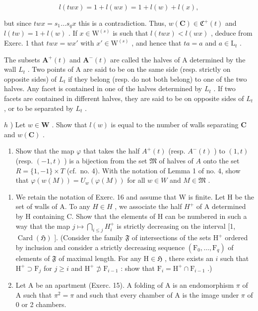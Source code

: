\[
l (t w x) = 1 + l (w x) = 1 + l (w) + l (x),
\]

but since \(twx = s_1 \ldots s_q x\) this is a contradiction. Thus, \(w(\mathbf{C}) \in \mathfrak{C}^+(t)\) and \(l(tw) = 1 + l(w)\) . If \(x \in \mathrm{W}^{(s)}\) is such that \(l(twx) < l(wx)\) , deduce from Exerc. 1 that \(twx = wx'\) with \(x' \in \mathrm{W}^{(s)}\) , and hence that \(ta = a\) and \(a \in \mathrm{L}_t\) .

The subsets \(\mathbf{A}^{+}(t)\) and \(\mathbf{A}^{-}(t)\) are called the halves of A determined by the wall \(L_{t}\) . Two points of A are said to be on the same side (resp. strictly on opposite sides) of \(L_{t}\) if they belong (resp. do not both belong) to one of the two halves. Any facet is contained in one of the halves determined by \(L_{t}\) . If two facets are contained in different halves, they are said to be on opposite sides of \(L_{t}\) , or to be separated by \(L_{t}\) .

\(h\) ) Let \(w \in \mathbf{W}\) . Show that \(l(w)\) is equal to the number of walls separating \(\mathbf{C}\) and \(w(\mathbf{C})\) .

\begin{enumerate}
\def\labelenumi{\roman{enumi})}
\tightlist
\item
  Show that the map \(\varphi\) that takes the half \(A^{+}(t)\) (resp. \(A^{-}(t)\) ) to \((1,t)\) (resp. \((-1,t)\) ) is a bijection from the set \(\mathfrak{M}\) of halves of \(A\) onto the set \(R = \{1, - 1\} \times T\) (cf.~no. 4). With the notation of Lemma 1 of no. 4, show that \(\varphi(w(M)) = U_w(\varphi(M))\) for all \(w\in W\) and \(M\in \mathfrak{M}\) .
\end{enumerate}

\begin{enumerate}
\def\labelenumi{\arabic{enumi})}
\setcounter{enumi}{16}
\item
  We retain the notation of Exerc. 16 and assume that W is finite. Let H be the set of walls of A. To any \(H \in H\) , we associate the half \(H^{+}\) of A determined by H containing C. Show that the elements of H can be numbered in such a way that the map \(j \mapsto \bigcap_{i \leqslant j} H_{i}^{+}\) is strictly decreasing on the interval {[}1, \(\operatorname{Card}(\mathfrak{H})\) {]}. (Consider the family \(\mathfrak{F}\) of intersections of the sets \(\mathrm{H}^{+}\) ordered by inclusion and consider a strictly decreasing sequence \((\mathrm{F}_{0},\ldots,\mathrm{F}_{q})\) of elements of \(\mathfrak{F}\) of maximal length. For any \(\mathrm{H}\in\mathfrak{H}\) , there exists an \(i\) such that \(\mathrm{H}^{+}\supset\mathrm{F}_{j}\) for \(j\geqslant i\) and \(\mathrm{H}^{+}\not\supset\mathrm{F}_{i-1}\) : show that \(\mathrm{F}_{i}=\mathrm{H}^{+}\cap\mathrm{F}_{i-1}\) .)
\item
  Let A be an apartment (Exerc. 15). A folding of A is an endomorphism \(\pi\) of A such that \(\pi^{2} = \pi\) and such that every chamber of A is the image under \(\pi\) of 0 or 2 chambers.
\end{enumerate}

